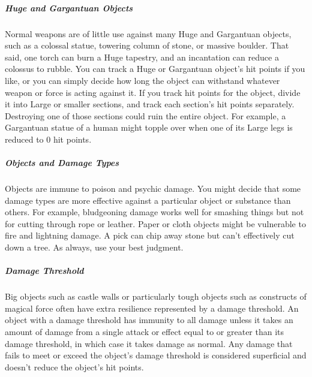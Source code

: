 \subparagraph*{Huge and Gargantuan Objects} Normal weapons are of little use against many Huge and Gargantuan objects, such as a colossal statue, towering column of stone, or massive boulder. That said, one torch can burn a Huge tapestry, and an  incantation can reduce a colossus to rubble. You can track a Huge or Gargantuan object's hit points if you like, or you can simply decide how long the object can withstand whatever weapon or force is acting against it. If you track hit points for the object, divide it into Large or smaller sections, and track each section's hit points separately. Destroying one of those sections could ruin the entire object. For example, a Gargantuan statue of a human might topple over when one of its Large legs is reduced to 0 hit points.

\subparagraph*{Objects and Damage Types} Objects are immune to poison and psychic damage. You might decide that some damage types are more effective against a particular object or substance than others. For example, bludgeoning damage works well for smashing things but not for cutting through rope or leather. Paper or cloth objects might be vulnerable to fire and lightning damage. A pick can chip away stone but can't effectively cut down a tree. As always, use your best judgment.

\subparagraph*{Damage Threshold} Big objects such as castle walls or particularly tough objects such as constructs of magical force often have extra resilience represented by a damage threshold. An object with a damage threshold has immunity to all damage unless it takes an amount of damage from a single attack or effect equal to or greater than its damage threshold, in which case it takes damage as normal. Any damage that fails to meet or exceed the object's damage threshold is considered superficial and doesn't reduce the object's hit points.
